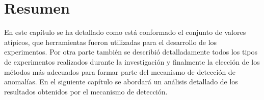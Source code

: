 \section{Resumen}

En este cap\'{i}tulo se ha detallado como est\'{a} conformado el conjunto de valores at\'{i}picos, que herramientas fueron utilizadas para el desarrollo de los experimentos. Por otra parte tambi\'{e}n se describi\'{o} detalladamente todos los tipos de experimentos realizados durante la investigaci\'{o}n y finalmente la elecci\'{o}n de los m\'{e}todos m\'{a}s adecuados para formar parte del mecanismo de detecci\'{o}n de anomal\'{i}as. En el siguiente cap\'{i}tulo se abordar\'{a} un an\'{a}lisis detallado de los resultados obtenidos por el mecanismo de detecci\'{o}n.
 